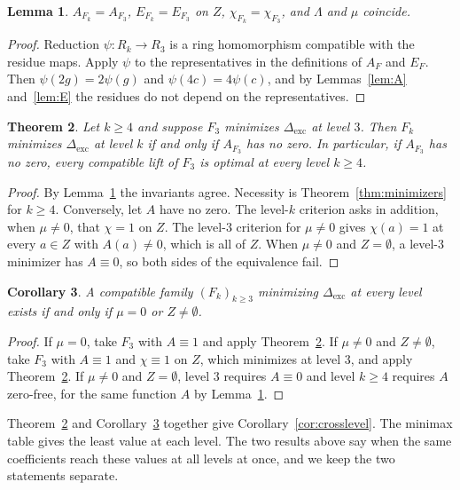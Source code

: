 \documentclass[11pt]{article}
\newtheorem{theorem}{Theorem}[section]
\newtheorem{lemma}[theorem]{Lemma}
\newtheorem{corollary}[theorem]{Corollary}
\theoremstyle{definition}
\theoremstyle{remark}
\newcommand{\Dexc}{\Delta_{\mathrm{exc}}}
\begin{document}
\begin{lemma}\label{lem:CL0}
$A_{F_k}=A_{F_3}$, $E_{F_k}=E_{F_3}$ on $Z$, $\chi_{F_k}=\chi_{F_3}$, and $\Lambda$ and $\mu$ coincide.
\end{lemma}
\begin{proof}
Reduction $\psi:R_k\to R_3$ is a ring homomorphism compatible with the residue maps. Apply $\psi$ to the
representatives in the definitions of $A_F$ and $E_F$. Then $\psi(2g)=2\psi(g)$ and $\psi(4c)=4\psi(c)$, and by
Lemmas~\ref{lem:A} and~\ref{lem:E} the residues do not depend on the representatives.
\end{proof}

\begin{theorem}\label{thm:CL}
Let $k\ge4$ and suppose $F_3$ minimizes $\Dexc$ at level $3$. Then $F_k$ minimizes $\Dexc$ at level $k$ if and
only if $A_{F_3}$ has no zero. In particular, if $A_{F_3}$ has no zero, every compatible lift of $F_3$ is
optimal at every level $k\ge4$.
\end{theorem}
\begin{proof}
By Lemma~\ref{lem:CL0} the invariants agree. Necessity is Theorem~\ref{thm:minimizers} for $k\ge4$. Conversely,
let $A$ have no zero. The level-$k$ criterion asks in addition, when $\mu\ne0$, that $\chi=1$ on $Z$. The level-$3$
criterion for $\mu\ne0$ gives $\chi(a)=1$ at every $a\in Z$ with $A(a)\ne0$, which is all of $Z$. When
$\mu\ne0$ and $Z=\emptyset$, a level-$3$ minimizer has $A\equiv0$, so both sides of the equivalence fail.
\end{proof}

\begin{corollary}\label{cor:CL2}
A compatible family $(F_k)_{k\ge3}$ minimizing $\Dexc$ at every level exists if and only if $\mu=0$ or
$Z\ne\emptyset$.
\end{corollary}
\begin{proof}
If $\mu=0$, take $F_3$ with $A\equiv1$ and apply Theorem~\ref{thm:CL}. If $\mu\ne0$ and $Z\ne\emptyset$, take
$F_3$ with $A\equiv1$ and $\chi\equiv1$ on $Z$, which minimizes at level $3$, and apply Theorem~\ref{thm:CL}.
If $\mu\ne0$ and $Z=\emptyset$, level $3$ requires $A\equiv0$ and level $k\ge4$ requires $A$ zero-free, for the
same function $A$ by Lemma~\ref{lem:CL0}.
\end{proof}

Theorem~\ref{thm:CL} and Corollary~\ref{cor:CL2} together give Corollary~\ref{cor:crosslevel}. The minimax table
gives the least value at each level. The two results above say when the same coefficients reach these values
at all levels at once, and we keep the two statements separate.
\end{document}
